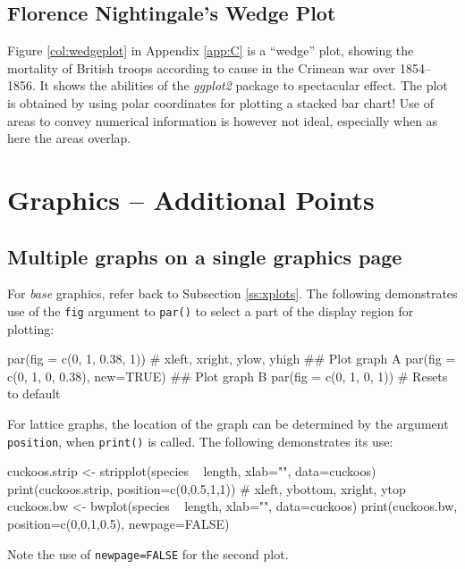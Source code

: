 \documentclass{tufte-book}\usepackage[]{graphicx}\usepackage[]{color}
\newcommand{\txtt}[1]{\texttt{#1}}
\begin{document}
\subsection*{Florence Nightingale's Wedge Plot}

Figure \ref{col:wedgeplot} in Appendix \ref{app:C} is a ``wedge''
plot, showing the mortality of British troops according to cause in
the Crimean war over 1854--1856. It shows the abilities of the {\em
  ggplot2} package to spectacular effect.  The plot is obtained by
using polar coordinates for plotting a stacked bar chart!  Use of
areas to convey numerical information is however not ideal, especially
when as here the areas overlap.


\section{Graphics -- Additional Points}
\subsection{Multiple graphs on a single graphics page}\label{ssec:xgph}

For \textit{base} graphics, refer back to Subsection \ref{ss:xplots}.
The following demonstrates use of the \txtt{fig}
argument to \txtt{par()} to select a part of the display region
for plotting:
\begin{Schunk}
\begin{Sinput}
par(fig = c(0, 1, 0.38, 1))
          # xleft, xright, ylow, yhigh
## Plot graph A
par(fig = c(0, 1, 0, 0.38), new=TRUE)
## Plot graph B
par(fig = c(0, 1, 0, 1))     # Resets to default
\end{Sinput}
\end{Schunk}
For lattice graphs, the location of the graph can be determined
by the argument \txtt{position}, when \txtt{print()} is called.
The following demonstrates its use:
\begin{fullwidth}
\begin{Schunk}
\begin{Sinput}
cuckoos.strip <- stripplot(species ~ length, xlab="", data=cuckoos)
print(cuckoos.strip, position=c(0,0.5,1,1))
                   # xleft, ybottom, xright, ytop
cuckoos.bw <- bwplot(species ~ length, xlab="", data=cuckoos)
print(cuckoos.bw, position=c(0,0,1,0.5), newpage=FALSE)
\end{Sinput}
\end{Schunk}
\end{fullwidth}
\noindent
Note the use of \txtt{newpage=FALSE} for the second plot.
\end{document}
